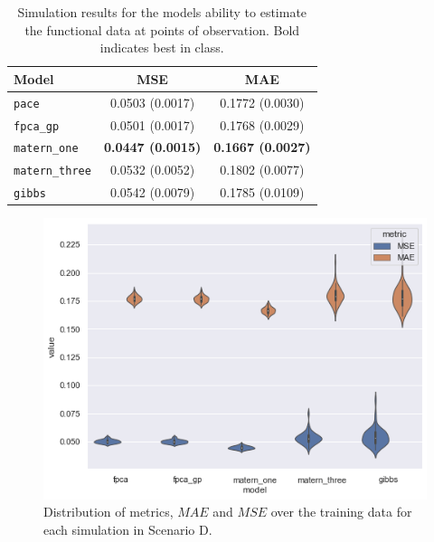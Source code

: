 \begin{table}[b]
	\caption[Simulation results for Scenario D on observed data.]{Simulation results for the models ability to estimate the functional data at points of observation. Bold indicates best in class.}
	\centering
	\label{tab:train_D}
	\begin{tabular}{lcc}
		\toprule
		\textbf{Model} & \textbf{MSE} & \textbf{MAE} \\
		\midrule
		\verb*|pace| & 0.0503 (0.0017)& 0.1772 (0.0030)\\
		\verb*|fpca_gp| & 0.0501 (0.0017) & 0.1768	(0.0029) \\
		\verb*|matern_one| & \textbf{0.0447	(0.0015)} & \textbf{0.1667 (0.0027)} \\
		\verb*|matern_three| & 0.0532 (0.0052)& 0.1802 (0.0077) \\
		\verb*|gibbs| & 0.0542 (0.0079) & 0.1785 (0.0109)\\
		\bottomrule
	\end{tabular}
\end{table}

\begin{figure}
	\centering
	\includegraphics[width=\textwidth]{train_D_dist}
	\caption[Distribution of metrics, $MAE$ and $MSE$ over the training data for each simulation in Scenario D.]{Distribution of metrics, $MAE$ and $MSE$ over the training data for each simulation in Scenario D.}
	\label{fig:train_D_dist}
\end{figure}

